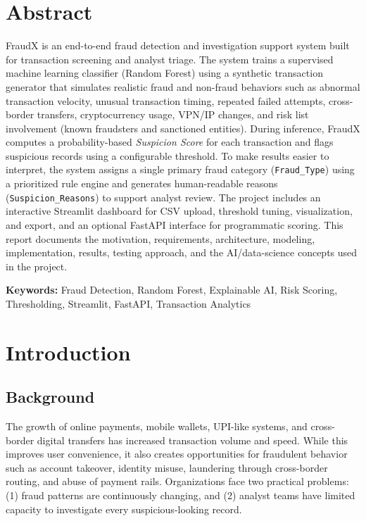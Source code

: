 \documentclass[12pt,a4paper]{report}
\begin{document}
\chapter*{Abstract}
FraudX is an end-to-end fraud detection and investigation support system built for transaction screening and analyst triage. The system trains a supervised machine learning classifier (Random Forest) using a synthetic transaction generator that simulates realistic fraud and non-fraud behaviors such as abnormal transaction velocity, unusual transaction timing, repeated failed attempts, cross-border transfers, cryptocurrency usage, VPN/IP changes, and risk list involvement (known fraudsters and sanctioned entities). During inference, FraudX computes a probability-based \textit{Suspicion Score} for each transaction and flags suspicious records using a configurable threshold. To make results easier to interpret, the system assigns a single primary fraud category (\texttt{Fraud\_Type}) using a prioritized rule engine and generates human-readable reasons (\texttt{Suspicion\_Reasons}) to support analyst review. The project includes an interactive Streamlit dashboard for CSV upload, threshold tuning, visualization, and export, and an optional FastAPI interface for programmatic scoring. This report documents the motivation, requirements, architecture, modeling, implementation, results, testing approach, and the AI/data-science concepts used in the project.

\vspace{0.4cm}
\noindent\textbf{Keywords:} Fraud Detection, Random Forest, Explainable AI, Risk Scoring, Thresholding, Streamlit, FastAPI, Transaction Analytics

\tableofcontents
\listoffigures
\listoftables

\chapter{Introduction}
\section{Background}
The growth of online payments, mobile wallets, UPI-like systems, and cross-border digital transfers has increased transaction volume and speed. While this improves user convenience, it also creates opportunities for fraudulent behavior such as account takeover, identity misuse, laundering through cross-border routing, and abuse of payment rails. Organizations face two practical problems: (1) fraud patterns are continuously changing, and (2) analyst teams have limited capacity to investigate every suspicious-looking record.
\end{document}
